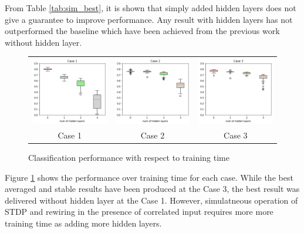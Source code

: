\documentclass[letterpaper, 10 pt, conference]{ieeeconf}  %
\begin{document}
From Table \ref{tab:sim_best}, it is shown that simply added hidden layers does not give a guarantee to improve performance. Any result with hidden layers has not outperformed the baseline which have been achieved from the previous work \cite{hopkins2018spiking} without hidden layer.

\begin{figure}[tbh]
    \centering
    \begin{centering}
    \begin{tabular}{ccc}
        \includegraphics[width=0.30\linewidth, trim=0cm 0cm 0cm 0.65cm, clip=true]{10trials/boxPlotHlayersC1}&
        \includegraphics[width=0.30\linewidth, trim=0cm 0cm 0cm 0.65cm, clip=true]{10trials/boxPlotHlayersC2}&
        \includegraphics[width=0.30\linewidth, trim=0cm 0cm 0cm 0.65cm, clip=true]{10trials/boxPlotHlayersC3}\\
        Case 1 & Case 2 & Case 3
        \end{tabular}
     \end{centering}
     \caption{Classification performance with respect to training time}
     \label{fig:bpTtime}
    \vspace{-10pt}
\end{figure}

Figure \ref{fig:bpTtime} shows the performance over training time for each case. While the best averaged and stable results have been produced at the Case 3, the best result was delivered without hidden layer at the Case 1. However, simulatneous operation of STDP and rewiring in the presence of correlated input requires more more training time as adding more hidden layers.
\end{document}
